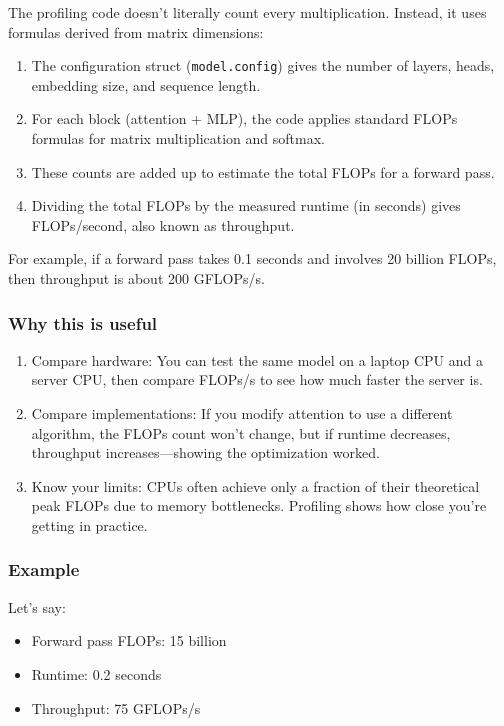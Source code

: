 \documentclass[
  letterpaper,
  DIV=11,
  numbers=noendperiod]{scrreprt}
\providecommand{\tightlist}{%
  \setlength{\itemsep}{0pt}\setlength{\parskip}{0pt}}
\begin{document}
The profiling code doesn't literally count every multiplication.
Instead, it uses formulas derived from matrix dimensions:

\begin{enumerate}
\def\labelenumi{\arabic{enumi}.}
\tightlist
\item
  The configuration struct (\texttt{model.config}) gives the number of
  layers, heads, embedding size, and sequence length.
\item
  For each block (attention + MLP), the code applies standard FLOPs
  formulas for matrix multiplication and softmax.
\item
  These counts are added up to estimate the total FLOPs for a forward
  pass.
\item
  Dividing the total FLOPs by the measured runtime (in seconds) gives
  FLOPs/second, also known as throughput.
\end{enumerate}

For example, if a forward pass takes 0.1 seconds and involves 20 billion
FLOPs, then throughput is about 200 GFLOPs/s.

\subsubsection{Why this is useful}\label{why-this-is-useful}

\begin{enumerate}
\def\labelenumi{\arabic{enumi}.}
\tightlist
\item
  Compare hardware: You can test the same model on a laptop CPU and a
  server CPU, then compare FLOPs/s to see how much faster the server is.
\item
  Compare implementations: If you modify attention to use a different
  algorithm, the FLOPs count won't change, but if runtime decreases,
  throughput increases---showing the optimization worked.
\item
  Know your limits: CPUs often achieve only a fraction of their
  theoretical peak FLOPs due to memory bottlenecks. Profiling shows how
  close you're getting in practice.
\end{enumerate}

\subsubsection{Example}\label{example}

Let's say:

\begin{itemize}
\tightlist
\item
  Forward pass FLOPs: 15 billion
\item
  Runtime: 0.2 seconds
\item
  Throughput: 75 GFLOPs/s
\end{itemize}
\end{document}
